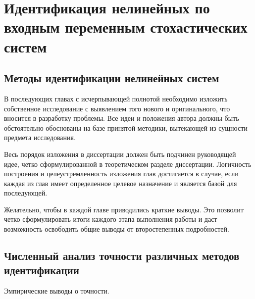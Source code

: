 \chapter{Идентификация нелинейных по входным переменным стохастических систем}

\section{Методы идентификации нелинейных систем}

В последующих главах с исчерпывающей полнотой  необходимо изложить собственное исследование с выявлением того нового и оригинального, что вносится в разработку проблемы. Все идеи и положения автора должны быть обстоятельно обоснованы на базе принятой методики, вытекающей из сущности предмета исследования.

Весь порядок изложения в диссертации должен быть подчинен  руководящей идее, четко сформулированной в теоретическом разделе диссертации. Логичность построения и целеустремленность изложения  глав достигается в случае, если каждая из глав имеет определенное целевое назначение и является базой для последующей.

Желательно, чтобы в каждой главе приводились краткие выводы. Это позволит четко сформулировать итоги каждого этапа выполнения работы и даст возможность освободить общие выводы от второстепенных подробностей.

\section{Численный анализ точности различных методов идентификации}

Эмпирические выводы о точности.